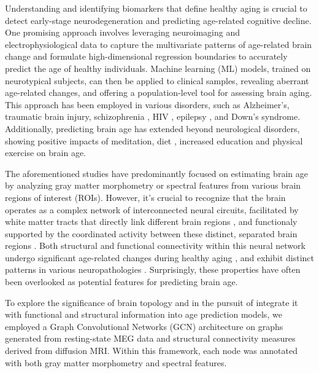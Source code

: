 \documentclass{cys}
\begin{document}
\bigskip
Understanding and identifying biomarkers that define healthy aging is crucial to detect early-stage neurodegeneration and predicting age-related cognitive decline. One promising approach involves leveraging neuroimaging and electrophysiological data to capture the multivariate patterns of age-related brain change and formulate high-dimensional regression boundaries to accurately predict the age of healthy individuals. Machine learning (ML) models, trained on neurotypical subjects, can then be applied to clinical samples, revealing aberrant age-related changes, and offering a population-level tool for assessing brain aging. This approach has been employed in various disorders, such as Alzheimer’s\cite{franke2012longitudinal, gaser2013brainage,gonneaud2020functional, gao2022brain}, traumatic brain injury\cite{cole2015prediction}, schizophrenia \cite{koutsouleris2014accelerated, zhuang1997event}, HIV \cite{kuhn2018augmented, cole2017increased} , epilepsy \cite{pardoe2017structural}, and Down’s syndrome\cite{cole2017brain}. Additionally, predicting brain age has extended beyond neurological disorders, showing positive impacts of meditation\cite{luders2016estimating}, diet \cite{onaolapo2019brain}, increased education and physical exercise \cite{steffener2016differences,vecchio2018neuroprotective}  on brain age. 

\bigskip
The aforementioned studies have predominantly focused on estimating brain age by analyzing gray matter morphometry or spectral features from various brain regions of interest (ROIs). However, it's crucial to recognize that the brain operates as a complex network of interconnected neural circuits, facilitated by white matter tracts that directly link different brain regions \cite{basser1994estimation}, and functionaly supported by the coordinated activity between these distinct, separated brain regions \cite{sala2015reorganization}. Both structural and functional connectivity within this neural network undergo significant age-related changes during healthy aging \cite{damoiseaux2017effects}, and exhibit distinct patterns in various neuropathologies \cite{monti2020interpretable, li2018brain, lin2016predicting}. Surprisingly, these properties have often been overlooked as potential features for predicting brain age.

To explore the significance of brain topology and in the pursuit of integrate it with functional and structural information into age prediction models, we employed a Graph Convolutional Networks (GCN) architecture on graphs generated from resting-state MEG data and structural connectivity measures derived from diffusion MRI. Within this framework, each node was annotated with both gray matter morphometry and spectral features. %
\end{document}
